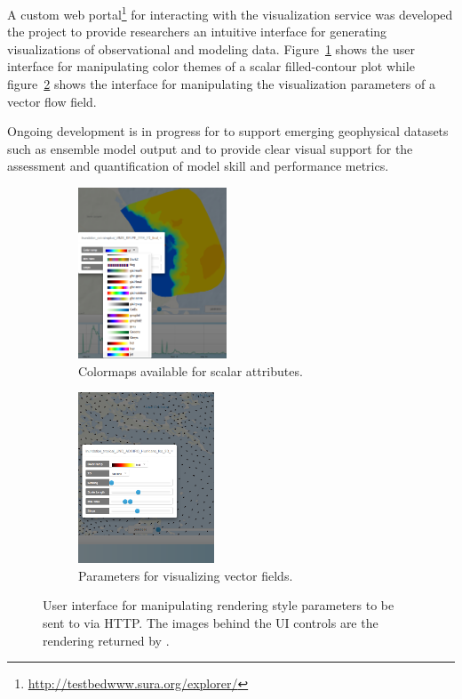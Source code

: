 A custom web
portal\footnote{\url{http://testbedwww.sura.org/explorer/}} for
interacting with the \sciwms{} visualization service was developed the
\comt{} \ioos{} project to provide researchers an intuitive interface
for generating visualizations of observational and modeling
data. Figure~\ref{fig:ui_colormaps_scalar} shows the user interface
for manipulating color themes of a scalar filled-contour plot while
figure~\ref{fig:ui_vector} shows the interface for manipulating the
visualization parameters of a vector flow field.

Ongoing development is in progress for \sciwms{} to support emerging
geophysical datasets such as ensemble model output and to provide
clear visual support for the assessment and quantification of model
skill and performance metrics.
\begin{figure}[ht!]
  \centering
  \begin{subfigure}[t]{0.45\textwidth}
    \centering
    \includegraphics[height=2in]{../figs/inundation_extratropical_VIMS_SELFE_2005_final_run_waves_UI_scalar}
    \caption{Colormaps available for scalar attributes.}
    \label{fig:ui_colormaps_scalar}
  \end{subfigure}
  \begin{subfigure}[t]{0.45\textwidth}
    \centering
    \includegraphics[height=2in]{../figs/ui_vectors_crop_inundation_tropical_UND_ADCIRC_Hurricane_Ike_3d_final_run_with_waves}
    \caption{Parameters for visualizing vector fields.}
  \label{fig:ui_vector}
  \end{subfigure}
  \caption{User interface for manipulating rendering style parameters
    to be sent to \sciwms{} via HTTP. The images behind the UI
    controls are the rendering returned by \sciwms{}.}
  \label{fig:ui}
\end{figure}

